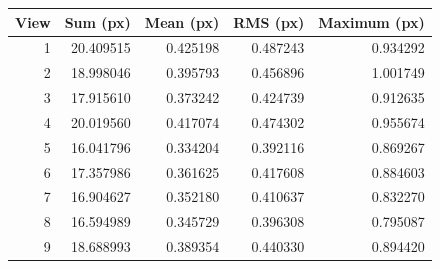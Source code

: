\begin{tabular}{rrrrr}\toprule
View & Sum (px) & Mean (px) & RMS (px) & Maximum (px)\\\midrule
1 & 20.409515 & 0.425198 & 0.487243 & 0.934292 \\
2 & 18.998046 & 0.395793 & 0.456896 & 1.001749 \\
3 & 17.915610 & 0.373242 & 0.424739 & 0.912635 \\
4 & 20.019560 & 0.417074 & 0.474302 & 0.955674 \\
5 & 16.041796 & 0.334204 & 0.392116 & 0.869267 \\
6 & 17.357986 & 0.361625 & 0.417608 & 0.884603 \\
7 & 16.904627 & 0.352180 & 0.410637 & 0.832270 \\
8 & 16.594989 & 0.345729 & 0.396308 & 0.795087 \\
9 & 18.688993 & 0.389354 & 0.440330 & 0.894420 \\
\bottomrule\end{tabular}
